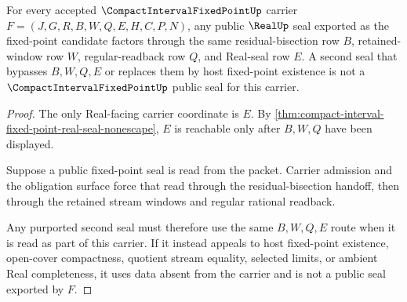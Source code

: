 \begin{theorem}
\label{thm:compact-interval-fixed-point-real-seal-uniqueness}
For every accepted $\CompactIntervalFixedPointUp$ carrier $F=(J,G,R,B,W,Q,E,H,C,P,N)$, any public $\RealUp$ seal exported as the fixed-point candidate factors through the same residual-bisection row $B$, retained-window row $W$, regular-readback row $Q$, and Real-seal row $E$. A second seal that bypasses $B,W,Q,E$ or replaces them by host fixed-point existence is not a $\CompactIntervalFixedPointUp$ public seal for this carrier.
\end{theorem}
\begin{proof}
The only Real-facing carrier coordinate is $E$. By \autoref{thm:compact-interval-fixed-point-real-seal-nonescape}, $E$ is reachable only after $B,W,Q$ have been displayed.

Suppose a public fixed-point seal is read from the packet. Carrier admission and the obligation surface force that read through the residual-bisection handoff, then through the retained stream windows and regular rational readback.

Any purported second seal must therefore use the same $B,W,Q,E$ route when it is read as part of this carrier. If it instead appeals to host fixed-point existence, open-cover compactness, quotient stream equality, selected limits, or ambient Real completeness, it uses data absent from the carrier and is not a public seal exported by $F$.
\end{proof}


